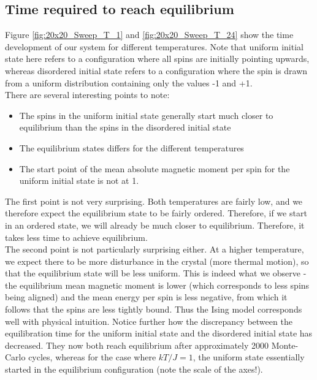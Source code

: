 \documentclass[a4paper, 10pt]{article}
\begin{document}
\subsection{Time required to reach equilibrium}\label{Discussion_time_for_eq}
Figure \ref{fig:20x20_Sweep_T_1} and \ref{fig:20x20_Sweep_T_24} show the time development of our system for different temperatures. Note that uniform initial state here refers to a configuration where all spins are initially pointing upwards, whereas disordered initial state refers to a configuration where the spin is drawn from a uniform distribution containing only the values -1 and +1.\\
\linebreak
There are several interesting points to note:
\begin{itemize}
\item The spins in the uniform initial state generally start much closer to equilibrium than the spins in the disordered initial state
\item The equilibrium states differs for the different temperatures
\item The start point of the mean absolute magnetic moment per spin for the uniform initial state is not at 1.
\end{itemize}
The first point is not very surprising. Both temperatures are fairly low, and we therefore expect the equilibrium state to be fairly ordered. Therefore, if we start in an ordered state, we will already be much closer to equilibrium. Therefore, it takes less time to achieve equilibrium. \\
\linebreak
The second point is not particularly surprising either. At a higher temperature, we expect there to be more disturbance in the crystal (more thermal motion), so that the equilibrium state will be less uniform. This is indeed what we observe - the equilibrium mean magnetic moment is lower (which corresponds to less spins being aligned) and the mean energy per spin is less negative, from which it follows that the spins are less tightly bound. Thus the Ising model corresponds well with physical intuition. Notice further how the discrepancy between the equilibration time for the uniform initial state and the disordered initial state has decreased. They now both reach equilibrium after approximately 2000 Monte-Carlo cycles, whereas for the case where $kT/J=1$, the uniform state essentially started in the equilibrium configuration (note the scale of the axes!).\\
\end{document}
